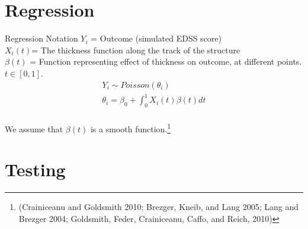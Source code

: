 \documentclass[9 pt]{beamer}
\newcommand{\es}[1]{\begin{equation*}\begin{split} #1 \end{split} \end{equation*}}
\begin{document}
\begin{frame}
\begin{figure}[ht]
\begin{minipage}[b]{0.45\linewidth}
\end{minipage}
\end{figure}
\end{frame}


\section*{Regression}
\begin{frame}{Regression Notation}
$Y_i$ = Outcome (simulated EDSS score) \\
$X_i(t)$= The thickness function along the track of the structure \\
$\beta(t)$ = Function representing effect of thickness on outcome, at different points.\\
$t \in [0,1]$.\\
\es{
Y_i \sim Poisson(\theta_i)\\
\theta_i =\beta_0 + \int_0^1 X_i(t)\beta(t) dt \\
}

We assume that $\beta(t)$ is a smooth function.\footnote{(Crainiceanu and Goldsmith 2010; Brezger, Kneib, and Lang 2005; Lang and Brezger 2004; Goldsmith, Feder, Crainiceanu, Caffo, and Reich, 2010)}

\end{frame}




\section*{Testing}
\end{document}
